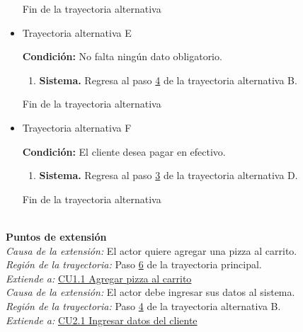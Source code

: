 \begin{itemize}
\begin{enumerate}
		\end{enumerate}
		
		Fin de la trayectoria alternativa
		
		\item \hypertarget{CU1:TAE}{Trayectoria alternativa E}
		
		\noindent \textbf{Condición:} No falta ningún dato obligatorio.
		
		\begin{enumerate}
			
			\item \textbf{Sistema.} Regresa al paso \hyperlink{CU1:TAB:P4}{4} de la trayectoria alternativa B.
			
		\end{enumerate}
		
		Fin de la trayectoria alternativa
		
		\item \hypertarget{CU1:TAF}{Trayectoria alternativa F}
		
		\noindent \textbf{Condición:} El cliente desea pagar en efectivo.
		
		\begin{enumerate}
			
			\item \textbf{Sistema.} Regresa al paso \hyperlink{CU1:TAD:P3}{3} de la trayectoria alternativa D.
			
		\end{enumerate}
		
		Fin de la trayectoria alternativa

	\end{itemize}

	\noindent \textbf{\\Puntos de extensión}\\

		\noindent \textit{Causa de la extensión:} El actor quiere agregar una pizza al carrito.\\
		\textit{Región de la trayectoria:} Paso \hyperlink{CU1:TP:P6}{6} de la trayectoria principal.\\
		\textit{Extiende a:} \hyperlink{CU1.1}{CU1.1 Agregar pizza al carrito}\\
		
		\noindent \textit{Causa de la extensión:} El actor debe ingresar sus datos al sistema.\\
		\textit{Región de la trayectoria:} Paso \hyperlink{CU1:TAB:P4}{4} de la trayectoria alternativa B.\\
		\textit{Extiende a:} \hyperlink{CU2.1}{CU2.1 Ingresar datos del cliente}\\

